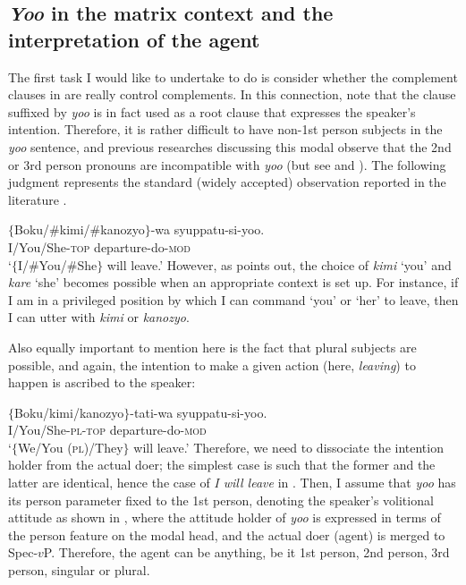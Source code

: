 \documentclass[output=paper]{langsci/langscibook}
\begin{document}
\subsection{\textit{Yoo} in the matrix context and the interpretation of the agent}
The first task I would like to undertake to do is consider whether the complement clauses in  are really control complements. In this connection, note that the clause suffixed by \textit{yoo} is in fact used as a root clause that expresses the speaker's intention. Therefore, it is rather difficult to have non-1st person subjects in the \textit{yoo} sentence, and previous researches discussing this modal observe that the 2nd or 3rd person pronouns are incompatible with \textit{yoo} (but see \citealt{moriyama1990} and \citealt{Narrog2009}). The following judgment represents the standard (widely accepted) observation reported in the literature \citep[cf.][]{fujii2006}.

\ea\label{shimamu6}
\gll $\{$Boku/\#kimi/\#kanozyo$\}$-wa syuppatu-si-yoo.\\
\phantom{$\{$}I/You/She-\textsc{top} departure-do-\textsc{mod}\\
\glt `$\{$I/\#You/\#She$\}$ will leave.'
\z
However, as \citet{shimamura2015} points out, the choice of \textit{kimi} `you' and \textit{kare} `she' becomes possible when an appropriate context is set up. For instance, if I am in a privileged position by which I can command `you' or `her' to leave, then I can utter  with \textit{kimi} or \textit{kanozyo}. 

Also equally important to mention here is the fact that plural subjects are possible, and again, the intention to make a given action (here, \textit{leaving}) to happen is ascribed to the speaker:

\ea\label{shimamu7}
\gll $\{$Boku/kimi/kanozyo$\}$-tati-wa syuppatu-si-yoo.\\
\phantom{$\{$}I/You/She-\textsc{pl-top} departure-do-\textsc{mod}\\
\glt `$\{$We/You (\textsc{pl})/They$\}$ will leave.'
\z
Therefore, we need to dissociate the intention holder from the actual doer; the simplest case is such that the former and the latter are identical, hence the case of \textit{I will leave} in . Then, I assume that \textit{yoo} has its person parameter fixed to the 1st person, denoting the speaker's volitional attitude as shown in , where the attitude holder of \textit{yoo} is expressed in terms of the person feature on the modal head, and the actual doer (agent) is merged to Spec-$v$P.
Therefore, the agent can be anything, be it 1st person, 2nd person, 3rd person, singular or plural.
\end{document}
